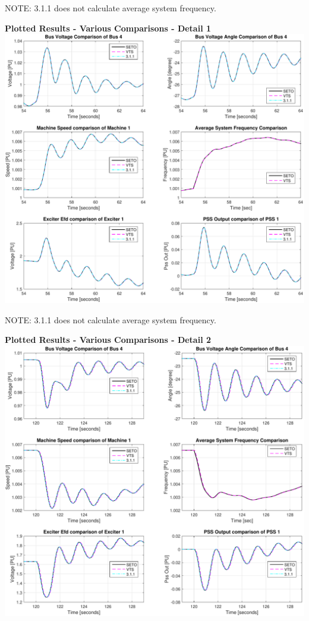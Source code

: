 NOTE: 3.1.1 does not calculate average system frequency.

\pagebreak
\textbf{Plotted Results - Various Comparisons - Detail 1} \ \\
\includegraphics[width=\linewidth]{examples/extendedTerm/verCompDetail1}

NOTE: 3.1.1 does not calculate average system frequency.

\pagebreak
\textbf{Plotted Results - Various Comparisons - Detail 2} \ \\
\includegraphics[width=\linewidth]{examples/extendedTerm/verCompDetail2}

